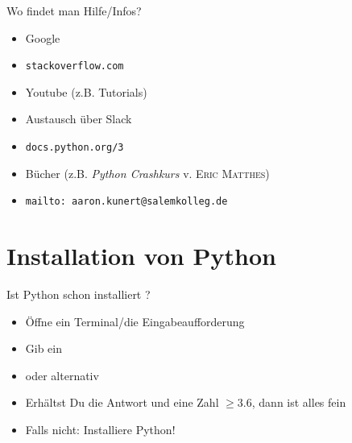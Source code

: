 \begin{frame}
\begin{block}{Wo findet man Hilfe/Infos?}
	\vspace{2pt}
	\begin{itemize}
		\item Google
		\item \texttt{stackoverflow.com}
		\item Youtube (z.B. Tutorials)
		\item Austausch über Slack 
		\item \texttt{docs.python.org/3}
		\item Bücher (z.B. \textit{Python Crashkurs} v. \textsc{Eric Matthes})
		\item \texttt{mailto: aaron.kunert@salemkolleg.de}
	\end{itemize}
\end{block}
\end{frame}


\section{Installation von Python}

\begin{frame}
\begin{block}{Ist Python schon installiert ?}
	\begin{itemize}
		\item Öffne ein Terminal/die Eingabeaufforderung
		\item Gib ein 
		\item oder alternativ 
		\item Erhältst Du die Antwort  und eine Zahl $\geq 3.6$, dann ist alles fein
		\item Falls nicht: Installiere Python!
	\end{itemize}
\end{block}
\end{frame}


